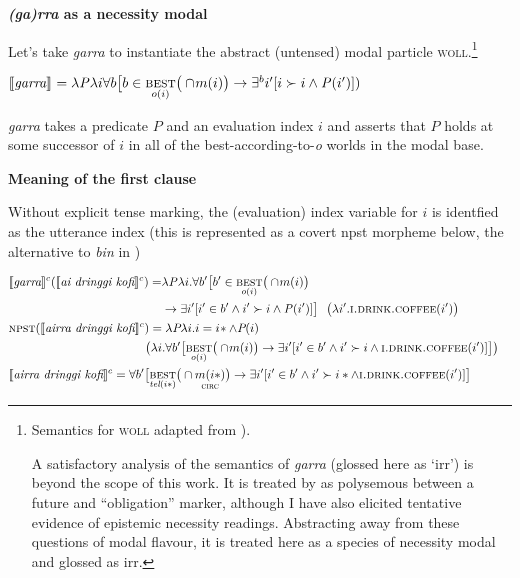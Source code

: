\a \textbf{\textit{(ga)rra} as a necessity modal}

Let's take \textit{garra} to instantiate the abstract (untensed) modal particle \textsc{woll}.\footnote{Semantics for \textsc{woll} adapted from \citet[71]{Condoravdi2002}).
	
	A satisfactory analysis of the semantics of \textit{garra} (glossed here as `\gls{irr}') is beyond the scope of this work. It is treated by \cite{Schultze-Berndt} as polysemous between a future and ``obligation'' marker, although I have also elicited tentative evidence of epistemic necessity readings. Abstracting away from these questions of modal flavour, it is treated here as a species of necessity modal and glossed as \gls{irr}.}

$ \denote{\textit{garra}} =\lambda\mathit P\lambda i\forall b\big[b\in\underset{o(i)}{\textsc{best}}\big(\cap\!m(i)\big)\to\exists ^bi'[i\succ i\wedge\mathit P(i')])$

\textit{garra} takes a predicate $ \textit{P} $ and an evaluation index $ i $ and asserts that $ \textit{P} $ holds at some successor of $ i $ in all of the best-according-to-\textit{o} worlds in the modal base.



\a \textbf{Meaning of the first clause} 

Without explicit tense marking, the (evaluation) index variable for $ i $ is identfied as the utterance index (this is represented as a covert \gls{npst} morpheme below, the alternative to \textit{bin} in )


\begin{align*}
&\begin{aligned}\denote[c]{\textit{garra}}(\denote[c]{\textit{ai dringgi kofi}}) =&\lambda\mathit P\lambda i.\forall b'\big[b'\in\underset{o(i)}{\textsc{best}}\big(\cap\!m(i)\big)\\&\to\exists i'[i'\in b'\wedge i'\succ i\wedge\mathit P(i')]\big]~~\big(\lambda i'.\textsc{i.drink.coffee}(i')\big)\end{aligned}\\
&\begin{aligned}\textsc{npst}(\denote[c]{\textit{airra dringgi kofi}})=\lambda\textit{P}\lambda i.i=i\!*\wedge\textit{P}(i)\\
	\big(\lambda i.\forall b'\big[\underset{o(i)}{\textsc{best}}\big(\cap\!m(i)\big)&\to\exists i'[i'\in b'\wedge i'\succ i\wedge\textsc{i.drink.coffee}(i')]\big]\big) \end{aligned}\\
&\begin{aligned}	\denote[c]{\textit{airra dringgi kofi}}=\forall b'\big[\underset{\textit{tel}(i*)}{\textsc{best}}\big(\cap\underset{\textsc{circ}}{m(i*)}\big)&\to\exists i'[i'\in b'\wedge i'\succ i*\wedge\textsc{i.drink.coffee}(i')]\big]\end{aligned}
\end{align*}

